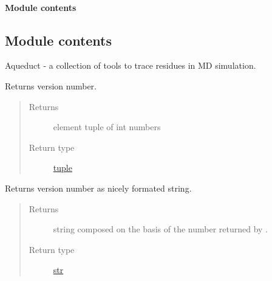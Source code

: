 \documentclass[a4paper,10pt,english]{sphinxmanual}
\begin{document}
\paragraph{Module contents}
\label{aqueduct.visual:module-aqueduct.visual}\label{aqueduct.visual:module-contents}

\subsection{Module contents}
\label{aqueduct:module-aqueduct}\label{aqueduct:module-contents}
Aqueduct - a collection of tools to trace residues in MD simulation.

\begin{fulllineitems}
\label{aqueduct:aqueduct.version}
Returns {\hyperref[aqueduct:module\string-aqueduct]{}} version number.
\begin{quote}\begin{description}
\item[{Returns}]  element tuple of int numbers

\item[{Return type}] \leavevmode
\href{https://docs.python.org/2/library/functions.html\#tuple}{tuple}

\end{description}\end{quote}

\end{fulllineitems}


\begin{fulllineitems}
\label{aqueduct:aqueduct.version_nice}
Returns {\hyperref[aqueduct:module\string-aqueduct]{}} version number as nicely formated string.
\begin{quote}\begin{description}
\item[{Returns}] \leavevmode
string composed on the basis of the number returned by {\hyperref[aqueduct:aqueduct.version]{}}.

\item[{Return type}] \leavevmode
\href{https://docs.python.org/2/library/functions.html\#str}{str}

\end{description}\end{quote}

\end{fulllineitems}
\end{document}
